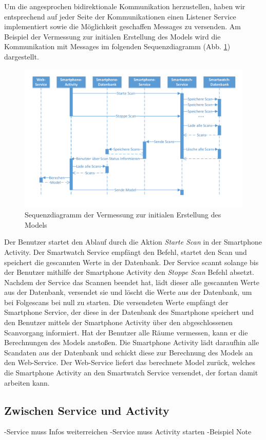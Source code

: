 Um die angesprochen bidirektionale Kommunikation herzustellen, haben wir entsprechend auf jeder Seite der Kommunikationen einen Listener Service implementiert sowie die Möglichkeit geschaffen Messages zu versenden. Am Beispiel der Vermessung zur initialen Erstellung des Models wird die Kommunikation mit Messages im folgenden Sequenzdiagramm (Abb. \ref{fig:SequenzdiagrammScan}) dargestellt.

\begin{figure}[H]
\centering
\includegraphics[width=0.9\linewidth]{../Bilder/SequenzdiagrammScan}
\caption{Sequenzdiagramm der Vermessung zur initialen Erstellung des Models}
\label{fig:SequenzdiagrammScan}
\end{figure}

Der Benutzer startet den Ablauf durch die Aktion \textit{Starte Scan} in der Smartphone Activity. Der Smartwatch Service empfängt den Befehl, startet den Scan und speichert die gescannten Werte in der Datenbank. Der Service scannt solange bis der Benutzer mithilfe der Smartphone Activity den \textit{Stoppe Scan} Befehl absetzt. Nachdem der Service das Scannen beendet hat, lädt dieser alle gescannten Werte aus der Datenbank, versendet sie und löscht die Werte aus der Datenbank, um bei Folgescans bei null zu starten. Die versendeten Werte empfängt der Smartphone Service, der diese in der Datenbank des Smartphone speichert und den Benutzer mittels der Smartphone Activity über den abgeschlossenen Scanvorgang informiert. Hat der Benutzer alle Räume vermessen, kann er die Berechnungen des Models anstoßen. Die Smartphone Activity lädt daraufhin alle Scandaten aus der Datenbank und schickt diese zur Berechnung des Models an den Web-Service. Der Web-Service liefert das berechnete Model zurück, welches die Smartphone Activity an den Smartwatch Service versendet, der fortan damit arbeiten kann.

\subsection{Zwischen Service und Activity}
-Service muss Infos weiterreichen
-Service muss Activity starten
-Beispiel Note

